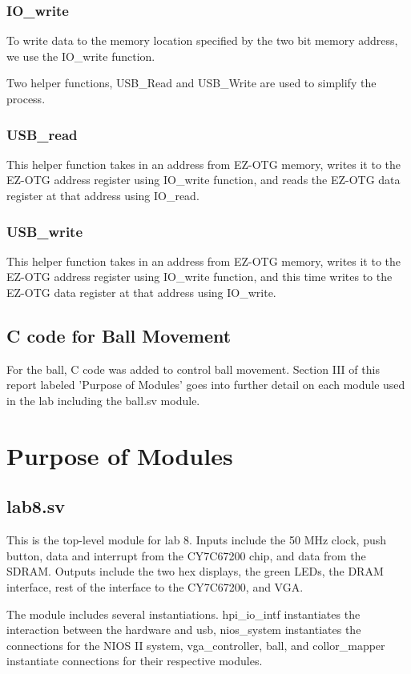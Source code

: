 \documentclass[journal, twocolumn, final,11pt,letterpaper]{IEEEtran}
\begin{document}
\subsubsection{IO\_write}
To write data to the memory location specified by the two bit memory address, we use the IO\_write function.

Two helper functions, USB\_Read and USB\_Write are used to simplify the process.
\subsubsection{USB\_read}
This helper function takes in an address from EZ-OTG memory, writes it to the EZ-OTG address register using IO\_write function, and reads the EZ-OTG data register at that address using IO\_read.  
\subsubsection{USB\_write}
This helper function takes in an address from EZ-OTG memory, writes it to the EZ-OTG address register using IO\_write function, and this time writes to the EZ-OTG data register at that address using IO\_write. 

\subsection{C code for Ball Movement}
For the ball, C code was added to control ball movement.  Section III of this report labeled 'Purpose of Modules' goes into further detail on each module used in the lab including the ball.sv module.  
  

\section{Purpose of Modules}

\subsection{lab8.sv}
This is the top-level module for lab 8.  Inputs include the 50 MHz clock, push button, data and interrupt from the CY7C67200 chip, and data from the SDRAM.  Outputs include the two hex displays, the green LEDs, the DRAM interface, rest of the interface to the CY7C67200, and VGA.  

The module includes several instantiations.  hpi\_io\_intf instantiates the interaction between the hardware and usb, nios\_system instantiates the connections for the NIOS II system, vga\_controller, ball, and collor\_mapper instantiate connections for their respective modules.
\end{document}
